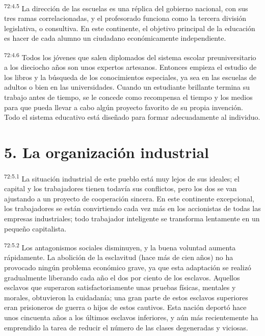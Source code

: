 \par
\textsuperscript{72:4.5} La dirección de las escuelas es una réplica del gobierno nacional, con sus tres ramas correlacionadas, y el profesorado funciona como la tercera división legislativa, o consultiva. En este continente, el objetivo principal de la educación es hacer de cada alumno un ciudadano económicamente independiente.

\par
\textsuperscript{72:4.6} Todos los jóvenes que salen diplomados del sistema escolar preuniversitario a los dieciocho años son unos expertos artesanos. Entonces empieza el estudio de los libros y la búsqueda de los conocimientos especiales, ya sea en las escuelas de adultos o bien en las universidades. Cuando un estudiante brillante termina su trabajo antes de tiempo, se le concede como recompensa el tiempo y los medios para que pueda llevar a cabo algún proyecto favorito de su propia invención. Todo el sistema educativo está diseñado para formar adecuadamente al individuo.

\section*{5. La organización industrial}
\par
\textsuperscript{72:5.1} La situación industrial de este pueblo está muy lejos de sus ideales; el capital y los trabajadores tienen todavía sus conflictos, pero los dos se van ajustando a un proyecto de cooperación sincera. En este continente excepcional, los trabajadores se están convirtiendo cada vez más en los accionistas de todas las empresas industriales; todo trabajador inteligente se transforma lentamente en un pequeño capitalista.

\par
\textsuperscript{72:5.2} Los antagonismos sociales disminuyen, y la buena voluntad aumenta rápidamente. La abolición de la esclavitud (hace más de cien años) no ha provocado ningún problema económico grave, ya que esta adaptación se realizó gradualmente liberando cada año el dos por ciento de los esclavos. Aquellos esclavos que superaron satisfactoriamente unas pruebas físicas, mentales y morales, obtuvieron la cuidadanía; una gran parte de estos esclavos superiores eran prisioneros de guerra o hijos de estos cautivos. Esta nación deportó hace unos cincuenta años a los últimos esclavos inferiores, y aún más recientemente ha emprendido la tarea de reducir el número de las clases degeneradas y viciosas.

